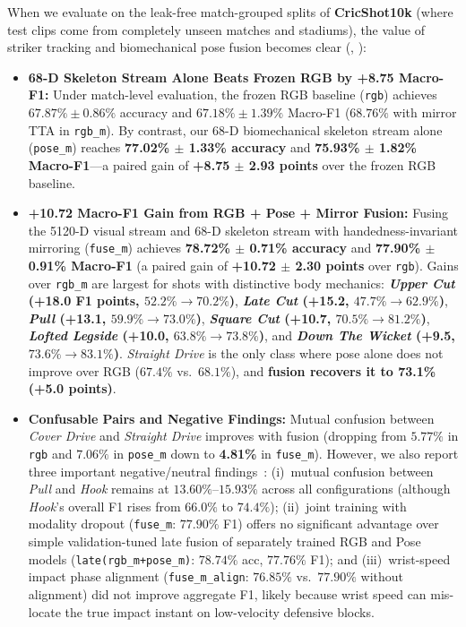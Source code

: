 When we evaluate on the leak-free match-grouped splits of \textbf{CricShot10k} (where test clips come from completely unseen matches and stadiums), the value of striker tracking and biomechanical pose fusion becomes clear (, ):
\begin{itemize}
    \item \textbf{68-D Skeleton Stream Alone Beats Frozen RGB by +8.75 Macro-F1:} Under match-level evaluation, the frozen RGB baseline (\texttt{rgb}) achieves $67.87\% \pm 0.86\%$ accuracy and $67.18\% \pm 1.39\%$ Macro-F1 ($68.76\%$ with mirror TTA in \texttt{rgb\_m}). By contrast, our 68-D biomechanical skeleton stream alone (\texttt{pose\_m}) reaches \textbf{77.02\% $\pm$ 1.33\% accuracy} and \textbf{75.93\% $\pm$ 1.82\% Macro-F1}—a paired gain of \textbf{+8.75 $\pm$ 2.93 points} over the frozen RGB baseline.
    \item \textbf{+10.72 Macro-F1 Gain from RGB + Pose + Mirror Fusion:} Fusing the 5120-D visual stream and 68-D skeleton stream with handedness-invariant mirroring (\texttt{fuse\_m}) achieves \textbf{78.72\% $\pm$ 0.71\% accuracy} and \textbf{77.90\% $\pm$ 0.91\% Macro-F1} (a paired gain of \textbf{+10.72 $\pm$ 2.30 points} over \texttt{rgb}). Gains over \texttt{rgb\_m} are largest for shots with distinctive body mechanics: \textbf{\textit{Upper Cut} (+18.0 F1 points, $52.2\% \rightarrow 70.2\%$)}, \textbf{\textit{Late Cut} (+15.2, $47.7\% \rightarrow 62.9\%$)}, \textbf{\textit{Pull} (+13.1, $59.9\% \rightarrow 73.0\%$)}, \textbf{\textit{Square Cut} (+10.7, $70.5\% \rightarrow 81.2\%$)}, \textbf{\textit{Lofted Legside} (+10.0, $63.8\% \rightarrow 73.8\%$)}, and \textbf{\textit{Down The Wicket} (+9.5, $73.6\% \rightarrow 83.1\%$)}. \textit{Straight Drive} is the only class where pose alone does not improve over RGB ($67.4\%$ vs.\ $68.1\%$), and \textbf{fusion recovers it to 73.1\% (+5.0 points)}.
    \item \textbf{Confusable Pairs and Negative Findings:} Mutual confusion between \textit{Cover Drive} and \textit{Straight Drive} improves with fusion (dropping from $5.77\%$ in \texttt{rgb} and $7.06\%$ in \texttt{pose\_m} down to \textbf{4.81\%} in \texttt{fuse\_m}). However, we also report three important negative/neutral findings~\cite{dai2024modality}: (i)~mutual confusion between \textit{Pull} and \textit{Hook} remains at $13.60\%$--$15.93\%$ across all configurations (although \textit{Hook}'s overall F1 rises from $66.0\%$ to $74.4\%$); (ii)~joint training with modality dropout (\texttt{fuse\_m}: $77.90\%$ F1) offers no significant advantage over simple validation-tuned late fusion of separately trained RGB and Pose models (\texttt{late(rgb\_m+pose\_m)}: $78.74\%$ acc, $77.76\%$ F1); and (iii)~wrist-speed impact phase alignment (\texttt{fuse\_m\_align}: $76.85\%$ vs.\ $77.90\%$ without alignment) did not improve aggregate F1, likely because wrist speed can mis-locate the true impact instant on low-velocity defensive blocks.
\end{itemize}

